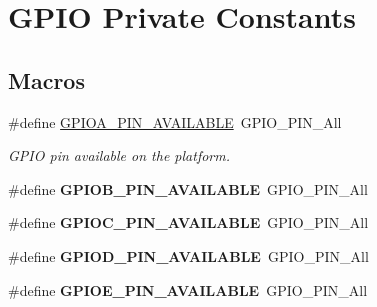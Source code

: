 \hypertarget{group___g_p_i_o_ex___private___constants}{}\section{G\+P\+IO Private Constants}
\label{group___g_p_i_o_ex___private___constants}
\subsection*{Macros}
\begin{DoxyCompactItemize}
\item 
\mbox{\label{group___g_p_i_o_ex___private___constants_ga03af8278605f5f2b68137ab0dfbcb725}} 
\#define \mbox{\hyperlink{group___g_p_i_o_ex___private___constants_ga03af8278605f5f2b68137ab0dfbcb725}{G\+P\+I\+O\+A\+\_\+\+P\+I\+N\+\_\+\+A\+V\+A\+I\+L\+A\+B\+LE}}~G\+P\+I\+O\+\_\+\+P\+I\+N\+\_\+\+All
\begin{DoxyCompactList}\small\item\em G\+P\+IO pin available on the platform. \end{DoxyCompactList}\item 
\mbox{\label{group___g_p_i_o_ex___private___constants_gade48da5c54f9f57c5ea1b3b4a746f04b}} 
\#define {\bfseries G\+P\+I\+O\+B\+\_\+\+P\+I\+N\+\_\+\+A\+V\+A\+I\+L\+A\+B\+LE}~G\+P\+I\+O\+\_\+\+P\+I\+N\+\_\+\+All
\item 
\mbox{\label{group___g_p_i_o_ex___private___constants_ga043750fbb7c18bc80c56c94b97fe8977}} 
\#define {\bfseries G\+P\+I\+O\+C\+\_\+\+P\+I\+N\+\_\+\+A\+V\+A\+I\+L\+A\+B\+LE}~G\+P\+I\+O\+\_\+\+P\+I\+N\+\_\+\+All
\item 
\mbox{\label{group___g_p_i_o_ex___private___constants_gaf7229c143190bfcddc6300b8a5e9c774}} 
\#define {\bfseries G\+P\+I\+O\+D\+\_\+\+P\+I\+N\+\_\+\+A\+V\+A\+I\+L\+A\+B\+LE}~G\+P\+I\+O\+\_\+\+P\+I\+N\+\_\+\+All
\item 
\mbox{\label{group___g_p_i_o_ex___private___constants_ga06b6d6771050b0b4e5254fe44ebf9a2e}} 
\#define {\bfseries G\+P\+I\+O\+E\+\_\+\+P\+I\+N\+\_\+\+A\+V\+A\+I\+L\+A\+B\+LE}~G\+P\+I\+O\+\_\+\+P\+I\+N\+\_\+\+All

\end{DoxyCompactItemize}
